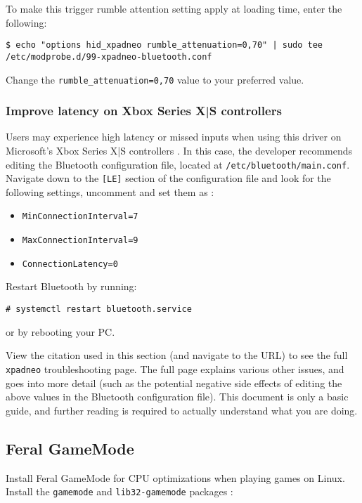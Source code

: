 \documentclass[a4paper]{article}
\begin{document}
To make this trigger rumble attention setting apply at loading time, enter the following: \cite{xpadneo-troubleshooting}

\begin{lstlisting}
$ echo "options hid_xpadneo rumble_attenuation=0,70" | sudo tee /etc/modprobe.d/99-xpadneo-bluetooth.conf
\end{lstlisting}
Change the \lstinline|rumble_attenuation=0,70| value to your preferred value.

\subsubsection{Improve latency on Xbox Series X|S controllers}

Users may experience high latency or missed inputs when using this driver on Microsoft's Xbox Series X|S controllers \cite{xpadneo-troubleshooting}. In this case, the developer recommends editing the Bluetooth configuration file, located at \lstinline|/etc/bluetooth/main.conf|. Navigate down to the \lstinline|[LE]| section of the configuration file and look for the following settings, uncomment and set them as \cite{xpadneo-troubleshooting}:
\begin{itemize}
    \item \lstinline|MinConnectionInterval=7|
    \item \lstinline|MaxConnectionInterval=9|
    \item \lstinline|ConnectionLatency=0|
\end{itemize}

Restart Bluetooth by running:
\begin{lstlisting}
# systemctl restart bluetooth.service
\end{lstlisting}
or by rebooting your PC.

View the citation used in this section (and navigate to the URL) to see the full \lstinline|xpadneo| troubleshooting page.
The full page explains various other issues, and goes into more detail (such as the potential negative side effects of editing the above values in the Bluetooth configuration file).
This document is only a basic guide, and further reading is required to actually understand what you are doing.

\subsection{Feral GameMode}

Install Feral GameMode for CPU optimizations when playing games on Linux.
Install the \lstinline|gamemode| and \lstinline|lib32-gamemode| packages \cite{arch-wiki-gamemode}:
\end{document}
